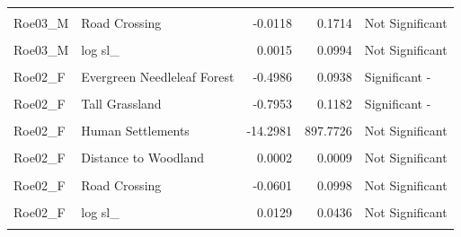 \documentclass[10pt,a4paper]{article}
\begin{document}
\begin{longtable}[t]{llrrl}
\cellcolor{gray!10}{Roe03\_M} & \cellcolor{gray!10}{Distance to Hedges} & \cellcolor{gray!10}{0.0009} & \cellcolor{gray!10}{0.0007} & \cellcolor{gray!10}{Significant +}\\
Roe03\_M & Road Crossing & -0.0118 & 0.1714 & Not Significant\\
\cellcolor{gray!10}{Roe03\_M} & \cellcolor{gray!10}{sl\_} & \cellcolor{gray!10}{0.0006} & \cellcolor{gray!10}{0.0006} & \cellcolor{gray!10}{Significant +}\\
\addlinespace
Roe03\_M & log sl\_ & 0.0015 & 0.0994 & Not Significant\\
\cellcolor{gray!10}{Roe03\_M} & \cellcolor{gray!10}{cos ta\_} & \cellcolor{gray!10}{-0.8241} & \cellcolor{gray!10}{0.0904} & \cellcolor{gray!10}{Significant -}\\
Roe02\_F & Evergreen Needleleaf Forest & -0.4986 & 0.0938 & Significant -\\
\cellcolor{gray!10}{Roe02\_F} & \cellcolor{gray!10}{Cropland} & \cellcolor{gray!10}{-0.9304} & \cellcolor{gray!10}{0.2062} & \cellcolor{gray!10}{Significant -}\\
Roe02\_F & Tall Grassland & -0.7953 & 0.1182 & Significant -\\
\addlinespace
\cellcolor{gray!10}{Roe02\_F} & \cellcolor{gray!10}{Permanent Wetland} & \cellcolor{gray!10}{-15.5219} & \cellcolor{gray!10}{2767.4264} & \cellcolor{gray!10}{Not Significant}\\
Roe02\_F & Human Settlements & -14.2981 & 897.7726 & Not Significant\\
\cellcolor{gray!10}{Roe02\_F} & \cellcolor{gray!10}{Other} & \cellcolor{gray!10}{-14.7043} & \cellcolor{gray!10}{1090.5249} & \cellcolor{gray!10}{Not Significant}\\
Roe02\_F & Distance to Woodland & 0.0002 & 0.0009 & Not Significant\\
\cellcolor{gray!10}{Roe02\_F} & \cellcolor{gray!10}{Distance to Hedges} & \cellcolor{gray!10}{0.0007} & \cellcolor{gray!10}{0.0003} & \cellcolor{gray!10}{Significant +}\\
\addlinespace
Roe02\_F & Road Crossing & -0.0601 & 0.0998 & Not Significant\\
\cellcolor{gray!10}{Roe02\_F} & \cellcolor{gray!10}{sl\_} & \cellcolor{gray!10}{0.0003} & \cellcolor{gray!10}{0.0003} & \cellcolor{gray!10}{Significant +}\\
Roe02\_F & log sl\_ & 0.0129 & 0.0436 & Not Significant\\
\cellcolor{gray!10}{Roe02\_F} & \cellcolor{gray!10}{cos ta\_} & \cellcolor{gray!10}{-0.6223} & \cellcolor{gray!10}{0.0363} & \cellcolor{gray!10}{Significant -}\\

\end{longtable}
\end{document}
